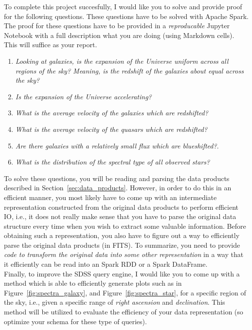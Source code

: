 To complete this project succesfully, I would like you to solve and provide proof for the following questions. These questions have to be solved with Apache Spark. The proof for these questions have to be provided in a \emph{reproducable} Jupyter Notebook with a full description what you are doing (using Markdown cells). This will suffice as your report.

\begin{enumerate}
  \item \emph{Looking at galaxies, is the expansion of the Universe uniform across all regions of the sky? Meaning, is the redshift of the galaxies about equal across the sky?}
  \item \emph{Is the expansion of the Universe accelerating?}
  \item \emph{What is the average velocity of the galaxies which are redshifted?}
  \item \emph{What is the average velocity of the quasars which are redshifted?}
  \item \emph{Are there galaxies with a relatively small flux which are blueshifted?}.
  \item \emph{What is the distribution of the spectral type of all observed stars?}
\end{enumerate}

To solve these questions, you will be reading and parsing the data products described in Section~\ref{sec:data_products}. However, in order to do this in an efficient manner, you most likely have to come up with an intermediate representation constructed from the original data products to perform efficient IO, i.e., it does not really make sense that you have to parse the original data structure every time when you wish to extract some valuable information. Before obtaining such a representation, you also have to figure out a way to efficiently parse the original data products (in FITS). To summarize, you need to provide \emph{code to transform the original data into some other representation} in a way that it efficiently can be read into an Spark RDD or a Spark DataFrame.\\

Finally, to improve the SDSS query engine, I would like you to come up with a method which is able to efficiently generate plots such as in Figure~\ref{fig:spectra_galaxy}, and Figure~\ref{fig:spectra_star}, for a specific region of the sky, i.e., given a specific range of \emph{right ascension} and \emph{declination}. This method will be utilized to evaluate the efficiency of your data representation (so optimize your schema for these type of queries).

